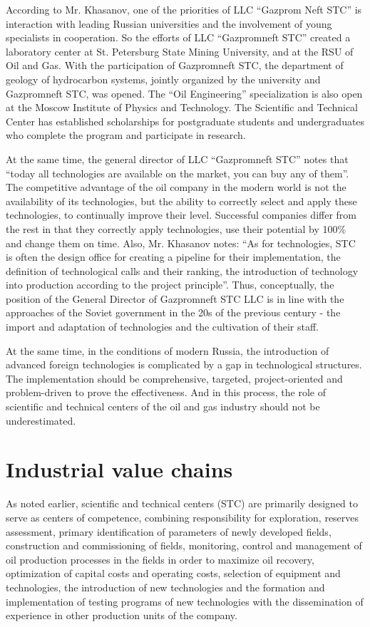 \documentclass[12pt]{report}
\theoremstyle{definition}
\begin{document}
According to Mr. Khasanov, one of the priorities of LLC ``Gazprom Neft STC'' is interaction with leading Russian universities and the involvement of young specialists in cooperation.
So the efforts of LLC ``Gazpromneft STC'' created a laboratory center at St. Petersburg State Mining University, and at the RSU of Oil and Gas. With the participation of Gazpromneft STC, the department of geology of hydrocarbon systems, jointly organized by the university and Gazpromneft STC, was opened.
The ``Oil Engineering'' specialization is also open at the Moscow Institute of Physics and Technology.
The Scientific and Technical Center has established scholarships for postgraduate students and undergraduates who complete the program and participate in research.

At the same time, the general director of LLC ``Gazpromneft STC'' notes that ``today all technologies are available on the market, you can buy any of them''.
The competitive advantage of the oil company in the modern world is not the availability of its technologies, but the ability to correctly select and apply these technologies, to continually improve their level.
Successful companies differ from the rest in that they correctly apply technologies, use their potential by 100\% and change them on time. Also, Mr. Khasanov notes: ``As for technologies, STC is often the design office for creating a pipeline for their implementation, the definition of technological calls and their ranking, the introduction of technology into production according to the project principle''.
Thus, conceptually, the position of the General Director of Gazpromneft STC LLC is in line with the approaches of the Soviet government in the 20s of the previous century - the import and adaptation of technologies and the cultivation of their staff.

At the same time, in the conditions of modern Russia, the introduction of advanced foreign technologies is complicated by a gap in technological structures.
The implementation should be comprehensive, targeted, project-oriented and problem-driven to prove the effectiveness.
And in this process, the role of scientific and technical centers of the oil and gas industry should not be underestimated.

\section{Industrial value chains}

As noted earlier, scientific and technical centers (STC) are primarily designed to serve as centers of competence, combining responsibility for exploration, reserves assessment, primary identification of parameters of newly developed fields, construction and commissioning of fields, monitoring, control and management of oil production processes in the fields in order to maximize oil recovery, optimization of capital costs and operating costs, selection of equipment and technologies, the introduction of new technologies and the formation and implementation of testing programs of new technologies with the dissemination of experience in other production units of the company.
\end{document}
